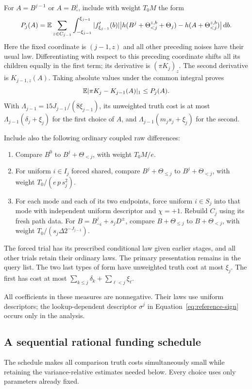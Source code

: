 For $A=B^{j-1}$ or $A=B_\circ^j$, include with weight $T_0M$ the form
\[
 P_j(A)=\mathbb E\sum_{z\in C_{j-1}}
 \int_{-\xi_{j-1}}^{\xi_{j-1}}|f_{\xi_{j-1}}'(b)|
 \big|h(B^j+\Theta_{<j}^{z,b}+\Theta_j)
              -h(A+\Theta_{<j}^{z,b})\big|\,\mathrm d b.
\]
Here the fixed coordinate is $(j-1,z)$ and all other preceding noises
have their usual law. Differentiating with respect to this preceding
coordinate shifts all its children equally in the first term; its
derivative is $(\pi K_j)_z$. The second derivative is $K_{j-1,z}(A)$.
Taking absolute values under the common integral proves
\[
 \mathbb E|\pi K_j-K_{j-1}(A)|_1\le P_j(A).
\]
With $\Lambda_{j-1}=15J_{j-1}/(8\xi_{j-1})$, its unweighted truth
cost is at most $\Lambda_{j-1}(\delta_j+\xi_j)$ for the first choice
of $A$, and $\Lambda_{j-1}(m_js_j+\xi_j)$ for the second.

Include also the following ordinary coupled raw differences:
\begin{enumerate}
\item Compare $B^0$ to $B^j+\Theta_{<j}$, with weight $T_0M/e$.
\item For uniform $i\in I_j$ forced shared, compare
      $B^j+\Theta_{\le j}$ to $B^j+\Theta_{<j}$, with weight
      $T_0/(e\,p\,s_j^2)$.
\item For each mode and each of its two endpoints, force uniform
      $i\in S_j$ into that mode with independent uniform descriptor
      and $\chi=+1$. Rebuild $C_j$ using its fresh path data. For
      $B=B^j_{\neg i}+s_jD^\pm$, compare $B+\Theta_{\le j}$ to
      $B+\Theta_{<j}$, with weight $T_0/(s_j\Delta2^{-J_{j-1}})$.
\end{enumerate}
The forced trial has its prescribed conditional law
given earlier stages, and all other trials retain their ordinary laws.
The primary presentation remains in the query list. The two last types
of form have unweighted truth cost at most $\xi_j$. The first has cost
at most $\sum_{k\le j}\delta_k+\sum_{\ell<j}\xi_\ell$.

All coefficients in these measures are nonnegative. Their laws use
uniform descriptors; the lookup-dependent descriptor $\sigma^j$ in
Equation~\ref{eq:reference-sign} occurs only in the analysis.

\subsection{A sequential rational funding schedule}\label{subsec:funding}

The schedule makes all comparison truth costs simultaneously small while
retaining the variance-relative estimates needed below. Every choice uses
only parameters already fixed.

